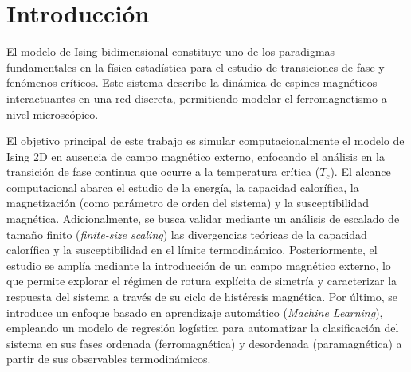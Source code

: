 \section{Introducción}

El modelo de Ising bidimensional constituye uno de los paradigmas fundamentales en la física estadística para el estudio de transiciones de fase y fenómenos críticos. Este sistema describe la dinámica de espines magnéticos interactuantes en una red discreta, permitiendo modelar el ferromagnetismo a nivel microscópico. 


El objetivo principal de este trabajo es simular computacionalmente el modelo de Ising 2D en ausencia de campo magnético externo, enfocando el análisis en la transición de fase continua que ocurre a la temperatura crítica ($T_c$). El alcance computacional abarca el estudio de la energía, la capacidad calorífica, la magnetización (como parámetro de orden del sistema) y la susceptibilidad magnética. Adicionalmente, se busca validar mediante un análisis de escalado de tamaño finito (\textit{finite-size scaling}) las divergencias teóricas de la capacidad calorífica y la susceptibilidad en el límite termodinámico. 
Posteriormente, el estudio se amplía mediante la introducción de un campo magnético externo, lo que permite explorar el régimen de rotura explícita de simetría y caracterizar la respuesta del sistema a través de su ciclo de histéresis magnética. Por último, se introduce un enfoque basado en aprendizaje automático (\textit{Machine Learning}), empleando un modelo de regresión logística para automatizar la clasificación del sistema en sus fases ordenada (ferromagnética) y desordenada (paramagnética) a partir de sus observables termodinámicos.